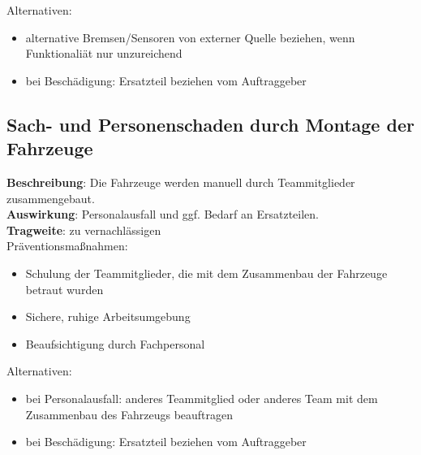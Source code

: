 \documentclass[a4paper, 12pt, titlepage]{scrartcl}
\begin{document}
		Alternativen: 
			\begin{itemize}
				\item alternative Bremsen/Sensoren von externer Quelle beziehen, wenn Funktionali\"at nur unzureichend
				\item bei Besch\"adigung: Ersatzteil beziehen vom Auftraggeber
			\end{itemize}
		
	\subsection{Sach- und Personenschaden durch Montage der Fahrzeuge}
		\textbf{Beschreibung}: Die Fahrzeuge werden manuell durch Teammitglieder zusammengebaut.\\
		\textbf{Auswirkung}: Personalausfall und ggf. Bedarf an Ersatzteilen.\\
		\textbf{Tragweite}: zu vernachl\"assigen\\
		Pr\"aventionsma\ss nahmen:
			\begin{itemize}
				\item Schulung der Teammitglieder, die mit dem Zusammenbau der Fahrzeuge betraut wurden
				\item Sichere, ruhige Arbeitsumgebung
				\item Beaufsichtigung durch Fachpersonal
			\end{itemize}
		Alternativen: 
			\begin{itemize}
				\item bei Personalausfall: anderes Teammitglied oder anderes Team mit dem Zusammenbau des Fahrzeugs beauftragen
				\item bei Besch\"adigung: Ersatzteil beziehen vom Auftraggeber
			\end{itemize}
		
\end{document}
